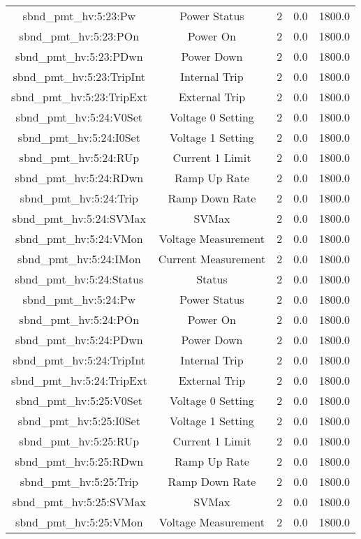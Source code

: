 \begin{table}[ptb]
\begin{tabular}{c | c c c c}
sbnd_pmt_hv:5:23:Pw & Power Status & 2 & 0.0 & 1800.0\\ 
sbnd_pmt_hv:5:23:POn & Power On & 2 & 0.0 & 1800.0\\ 
sbnd_pmt_hv:5:23:PDwn & Power Down & 2 & 0.0 & 1800.0\\ 
sbnd_pmt_hv:5:23:TripInt & Internal Trip & 2 & 0.0 & 1800.0\\ 
sbnd_pmt_hv:5:23:TripExt & External Trip & 2 & 0.0 & 1800.0\\ 
sbnd_pmt_hv:5:24:V0Set & Voltage 0 Setting & 2 & 0.0 & 1800.0\\ 
sbnd_pmt_hv:5:24:I0Set & Voltage 1 Setting & 2 & 0.0 & 1800.0\\ 
sbnd_pmt_hv:5:24:RUp & Current 1 Limit & 2 & 0.0 & 1800.0\\ 
sbnd_pmt_hv:5:24:RDwn & Ramp Up Rate & 2 & 0.0 & 1800.0\\ 
sbnd_pmt_hv:5:24:Trip & Ramp Down Rate & 2 & 0.0 & 1800.0\\ 
sbnd_pmt_hv:5:24:SVMax & SVMax & 2 & 0.0 & 1800.0\\ 
sbnd_pmt_hv:5:24:VMon & Voltage Measurement & 2 & 0.0 & 1800.0\\ 
sbnd_pmt_hv:5:24:IMon & Current Measurement & 2 & 0.0 & 1800.0\\ 
sbnd_pmt_hv:5:24:Status & Status & 2 & 0.0 & 1800.0\\ 
sbnd_pmt_hv:5:24:Pw & Power Status & 2 & 0.0 & 1800.0\\ 
sbnd_pmt_hv:5:24:POn & Power On & 2 & 0.0 & 1800.0\\ 
sbnd_pmt_hv:5:24:PDwn & Power Down & 2 & 0.0 & 1800.0\\ 
sbnd_pmt_hv:5:24:TripInt & Internal Trip & 2 & 0.0 & 1800.0\\ 
sbnd_pmt_hv:5:24:TripExt & External Trip & 2 & 0.0 & 1800.0\\ 
sbnd_pmt_hv:5:25:V0Set & Voltage 0 Setting & 2 & 0.0 & 1800.0\\ 
sbnd_pmt_hv:5:25:I0Set & Voltage 1 Setting & 2 & 0.0 & 1800.0\\ 
sbnd_pmt_hv:5:25:RUp & Current 1 Limit & 2 & 0.0 & 1800.0\\ 
sbnd_pmt_hv:5:25:RDwn & Ramp Up Rate & 2 & 0.0 & 1800.0\\ 
sbnd_pmt_hv:5:25:Trip & Ramp Down Rate & 2 & 0.0 & 1800.0\\ 
sbnd_pmt_hv:5:25:SVMax & SVMax & 2 & 0.0 & 1800.0\\ 
sbnd_pmt_hv:5:25:VMon & Voltage Measurement & 2 & 0.0 & 1800.0\\ 

\end{tabular}
\end{table}
